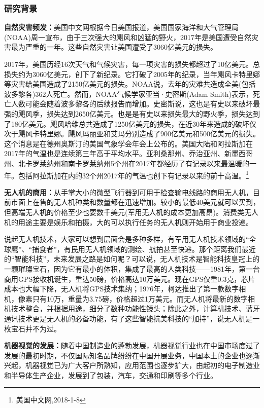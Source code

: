 \subsubsection{研究背景}
\textbf{自然灾害频发：}美国中文网根据今日美国报道，美国国家海洋和大气管理局(NOAA)周一宣布，由于三次强大的飓风和凶猛的野火，2017年是美国遭受自然灾害最为严重的一年。这些自然灾害让美国遭受了3060亿美元的损失。

2017年，美国历经16次天气和气候灾害，每一项灾害的损失都超过了10亿美元。总损失约为3060亿美元，创下了新纪录。它打破了2005年的纪录，当年飓风卡特里娜等灾害给美国造成了2150亿美元的损失。NOAA说，去年的灾难共造成全美(包括波多黎各)362人死亡。然而，NOAA气候学家亚当·史密斯(Adam Smith)表示，死亡人数可能会随着波多黎各的后续报告而增加。史密斯说，这也是有史以来破坏最强的飓风季，损失达到2650亿美元。也是是有史以来损失最大的野火季，损失达到了180亿美元。飓风哈维总共造成了1250亿美元的损失，在近30年来造成的破坏仅次于飓风卡特里娜。飓风玛丽亚和艾玛分别造成了900亿美元和500亿美元的损失。这个消息是在德州奥斯汀的美国气象学会年会上公布的。美国大陆和阿拉斯加在2017年的气温也是连续第三年高于平均水平。亚利桑那州、乔治亚州、新墨西哥州、北卡罗莱纳州和南卡罗莱纳州5个州在2017年都经历了有记录以来最温暖的一年。包括阿拉斯加在内的32个州2017年的气温也创下有记录以来的前十高温。\footnote{美国中文网,2018-1-8}

\textbf{无人机的商用：}从手掌大小的微型飞行器到可用于检查输电线路的商用无人机，目前市面上在售的无人机种类和数量都在迅速增加。较小的最低40美元就可以买到，但高端无人机的价格至少也要数千美元(军用无人机的成本更加高昂)。消费类无人机的用途主要是娱乐和拍摄，大的可以执行任务的无人机则开始用于商业投递。

说起无人机技术，大家可以想到层面会是多种多样，有军用无人机技术领域的“全球鹰”、“捕食者”，有民用无人机领域的测绘、航拍甚至快递。那个距离我们最近的“智能科技”，未来发展之路是如何呢？可以说，无人机技术是智能科技皇冠上的一颗璀璨宝石，因为它有最小的体积，集成了最高的人类科技——1981年，第一台商用GPS接收机诞生，重达50磅，价格高达10万美元。现在GPS仅重0.3克，芯片成本也大幅下降，无人机将GPS技术集纳；1976年，柯达推出了第一款数字相机，像素只有10万，重量为3.75磅，价格超过1万美元。而无人机将最新的数字相机技术整合，并根据用途，细分了数种功能性镜头；除此之外，计算机技术、蓝牙通讯技术更是无人机的必备功能，有了这些智能抗美科技的“加持”，说无人机是一枚宝石并不为过。

\textbf{机器视觉的发展：}随着中国制造业的蓬勃发展，机器视觉行业也在中国市场度过了发展的最初时期，不仅国际知名品牌纷纷在中国开展业务，中国本土的企业也逐渐兴起，机器视觉已为广大客户所熟知，应用范围也逐步扩大，由起初的电子制造业和半导体生产企业，发展到了包装，汽车，交通和印刷等多个行业。

